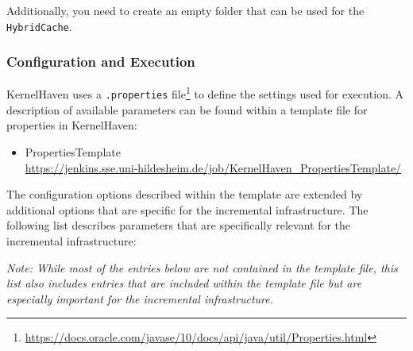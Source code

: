 \documentclass[a4paper]{article}
\begin{document}
Additionally, you need to create an empty folder that can be used for the \texttt{HybridCache}. 

\clearpage
\subsubsection{Configuration and Execution}

KernelHaven uses a \texttt{.properties} file\footnote{\url{https://docs.oracle.com/javase/10/docs/api/java/util/Properties.html}} to define the settings used for execution. A description of available parameters can be found within a template file for properties in KernelHaven:
\begin{sloppypar}
	\begin{itemize}
	\item PropertiesTemplate \\
	  \url{https://jenkins.sse.uni-hildesheim.de/job/KernelHaven\_PropertiesTemplate/}
	\end{itemize}
\end{sloppypar}

The configuration options described within the template are extended by additional options that are specific for the incremental infrastructure. The following list describes parameters that are specifically relevant for the incremental infrastructure:

\emph{Note: While most of the entries below are not contained in the template file, this list also includes entries that are included within the template file but are especially important for the incremental infrastructure.}
\end{document}
